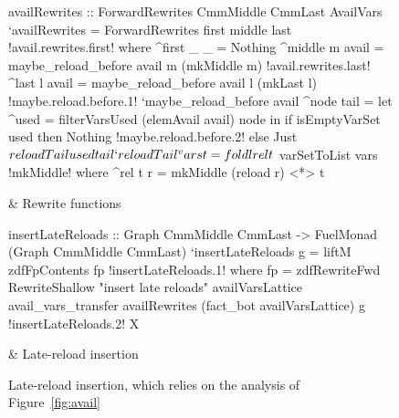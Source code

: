 \documentclass[blockstyle,preprint,natbib,nocopyrightspace]{sigplanconf}
\newcommand\seclabel[1]{\label{sec:#1}}
\newcommand\figref[1]{Figure~\ref{fig:#1}}
\newcommand\figlabel[1]{\label{fig:#1}}
\begin{document}
\begin{figure*}
\begin{codetable}
\T
\begin{code}
availRewrites :: ForwardRewrites CmmMiddle CmmLast AvailVars
`availRewrites = ForwardRewrites first middle last
!avail.rewrites.first!  where ^first _ _ = Nothing
        ^middle m avail = maybe_reload_before avail m (mkMiddle m)
!avail.rewrites.last!        ^last   l avail = maybe_reload_before avail l (mkLast l)
!maybe.reload.before.1!        `maybe_reload_before avail ^node tail =
            let ^used = filterVarsUsed (elemAvail avail) node
            in  if isEmptyVarSet used then Nothing
!maybe.reload.before.2!                else Just $ reloadTail used tail
        `reloadTail ^vars t = foldl rel t $ varSetToList vars
!mkMiddle!          where ^rel t r = mkMiddle (reload r) <*> t
\end{code}
\B
& Rewrite \mbox{functions}\\
\hline

\T
\begin{code}
insertLateReloads :: Graph CmmMiddle CmmLast -> FuelMonad (Graph CmmMiddle CmmLast)
`insertLateReloads g = liftM zdfFpContents fp
!insertLateReloads.1!  where fp = zdfRewriteFwd RewriteShallow "insert late reloads" availVarsLattice
               avail_vars_transfer availRewrites (fact_bot availVarsLattice) g
!insertLateReloads.2!                           X
\end{code}
& Late-reload insertion\\
\end{codetable}
\caption{Late-reload insertion, which relies on the analysis of \figref{avail}}
\figlabel{avail-rewrites}
\end{figure*}


\seclabel{dfengine-spec}
\end{document}
